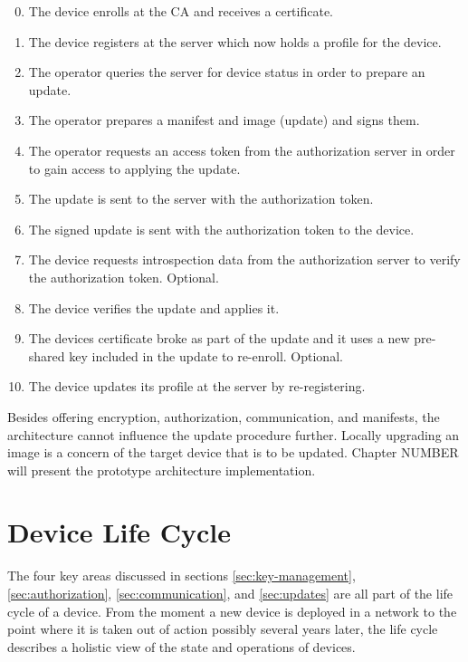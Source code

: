 \documentclass[0-thesis.tex]{subfiles}
\begin{document}
\begin{enumerate}
    \setcounter{enumi}{-1}
    \item The device enrolls at the CA and receives a certificate.
    \item The device registers at the server which now holds a profile for the device.
    \item The operator queries the server for device status in order to prepare an update.
    \item The operator prepares a manifest and image (update) and signs them.
    \item The operator requests an access token from the authorization server in order to
            gain access to applying the update.
    \item The update is sent to the server with the authorization token.
    \item The signed update is sent with the authorization token to the device.
    \item The device requests introspection data from the authorization server
            to verify the authorization token. Optional.
    \item The device verifies the update and applies it.
    \item The devices certificate broke as part of the update and it uses a new pre-shared
            key included in the update to re-enroll. Optional.
    \item The device updates its profile at the server by re-registering.
\end{enumerate}

Besides offering encryption, authorization, communication, and manifests, the architecture
cannot influence the update procedure further. Locally upgrading an image is a concern of
the target device that is to be updated. Chapter NUMBER will present the prototype
architecture implementation.

\section{Device Life Cycle}
\label{sec:device-lifecycle}
The four key areas discussed in sections \ref{sec:key-management},
\ref{sec:authorization}, \ref{sec:communication}, and \ref{sec:updates} are all part of
the life cycle of a device. From the moment a new device is deployed in a network to the
point where it is taken out of action possibly several years later, the life cycle
describes a holistic view of the state and operations of devices.
\end{document}
